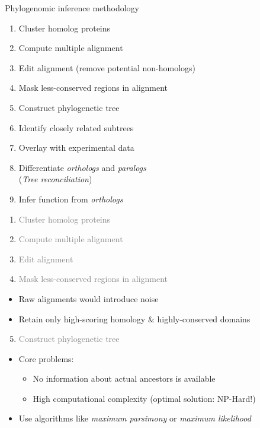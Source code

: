 \documentclass[14pt,xcolor=dvipsnames,pdftex]{beamer}
\begin{document}
\begin{frame}[allowframebreaks]{Phylogenomic inference methodology}
 \begin{enumerate}
  \item Cluster homolog proteins
  \item Compute multiple alignment
  \item Edit alignment (remove potential non-homologs)
  \item Mask less-conserved regions in alignment
  \item Construct phylogenetic tree
  \item Identify closely related subtrees
  \item Overlay with experimental data
  \item Differentiate \textit{orthologs} and \textit{paralogs}\\
	(\textit{Tree reconciliation})
  \item Infer function from \textit{orthologs}
 \end{enumerate}
 \framebreak
 \begin{enumerate}
   \item \textcolor{gray}{Cluster homolog proteins}
   \item \textcolor{gray}{Compute multiple alignment}
   \item \textcolor{gray}{Edit alignment}
   \item \textcolor{gray}{Mask less-conserved regions in alignment}
 \end{enumerate}
 \begin{itemize}
  \item Raw alignments would introduce noise
  \item Retain only high-scoring homology \& highly-conserved domains
 \end{itemize}
 \framebreak
 \begin{enumerate}
  \setcounter{enumi}{4}
  \item \textcolor{gray}{Construct phylogenetic tree}
 \end{enumerate}
 \begin{itemize}
  \item Core problems:
  \begin{itemize}
   \item No information about actual ancestors is available
   \item High computational complexity (optimal solution: NP-Hard!)
  \end{itemize}
  \item Use algorithms like \textit{maximum parsimony} or \textit{maximum likelihood}

\end{itemize}
\end{frame}
\end{document}
